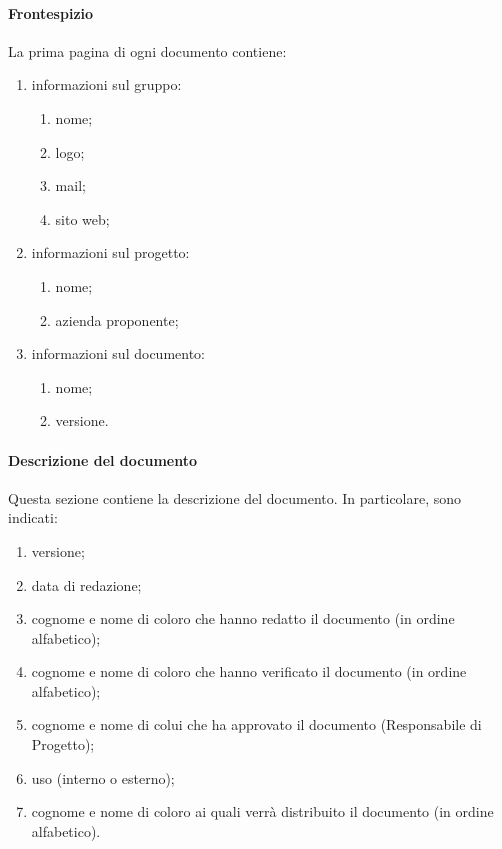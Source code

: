 			\paragraph{Frontespizio}
				La prima pagina di ogni documento contiene:
				\begin{enumerate}
					\item informazioni sul gruppo:
					\begin{enumerate}
						\item nome;
						\item logo;
						\item mail;
						\item sito web;
					\end{enumerate}
					\item informazioni sul progetto:
					\begin{enumerate}
						\item nome;
						\item azienda proponente;
					\end{enumerate}
					\item informazioni sul documento:
					\begin{enumerate}
						\item nome;
						\item versione.
					\end{enumerate}
				\end{enumerate}
			\paragraph{Descrizione del documento}
				Questa sezione contiene la descrizione del documento. In particolare, sono indicati:
				\begin{enumerate}
					\item versione;
					\item data di redazione;
					\item cognome e nome di coloro che hanno redatto il documento (in ordine alfabetico);
					\item cognome e nome di coloro che hanno verificato il documento (in ordine alfabetico);
					\item cognome e nome di colui che ha approvato il documento (Responsabile di Progetto);
					\item uso (interno o esterno);
					\item cognome e nome di coloro ai quali verrà distribuito il documento (in ordine alfabetico).
				\end{enumerate}
